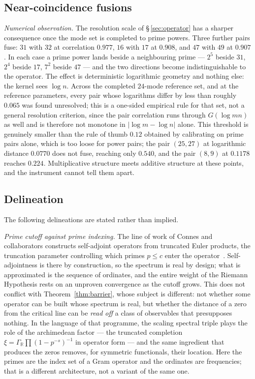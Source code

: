 \documentclass[11pt]{article}
\begin{document}
\subsection{Near-coincidence fusions}

\emph{Numerical observation.} The resolution scale of
\S\,\ref{sec:operator} has a sharper consequence once
the mode set is completed to prime powers. Three further pairs fuse: $31$ with $32$ at
correlation $0.977$, $16$ with $17$ at $0.908$, and $47$ with $49$ at $0.907$.
In each case a prime power lands beside a neighbouring prime --- $2^5$ beside
$31$, $2^4$ beside $17$, $7^2$ beside $47$ --- and the two directions become
indistinguishable to the operator. The effect is deterministic logarithmic
geometry and nothing else: the kernel sees $\log n$. Across the completed
$24$-mode reference set, and at the reference parameters, every pair whose
logarithms differ by less than roughly $0.065$ was found unresolved; this is
a one-sided empirical rule for that set, not a general resolution criterion,
since the pair correlation runs through $G(\log mn)$ as well and is
therefore not monotone in $|\log m-\log n|$ alone. This threshold is genuinely smaller than the rule of
thumb $0.12$ obtained by calibrating on prime pairs alone, which is too loose
for power pairs; the pair $(25,27)$ at logarithmic distance $0.0770$ does not
fuse, reaching only $0.540$, and the pair $(8,9)$ at $0.1178$ reaches
$0.224$. Multiplicative structure meets additive structure at these points,
and the instrument cannot tell them apart.

\subsection{Delineation}

The following delineations are stated rather than implied.

\emph{Prime cutoff against prime indexing.} The line of work of Connes and
collaborators constructs self-adjoint operators from truncated Euler products,
the truncation parameter controlling which primes $p\le c$ enter the
operator~\cite{Connes26,ConnesVS25,Groskin26a}. Self-adjointness is there by
construction, so the spectrum is real by design; what is approximated is the
sequence of ordinates, and the entire weight of the Riemann Hypothesis rests
on an unproven convergence as the cutoff grows. This does not conflict with
Theorem~\ref{thm:barrier}, whose subject is different: not whether some
operator can be built whose spectrum is real, but whether the distance of a
zero from the critical line can be \emph{read off} a class of observables that
presupposes nothing. In the language of that programme, the scaling spectral
triple plays the role of the archimedean factor --- the truncated completion
$\xi=\Gamma_{\mathbb{R}}\prod(1-p^{-s})^{-1}$ in operator form --- and the same
ingredient that produces the zeros removes, for symmetric functionals, their
location. Here the primes are the index set of a Gram operator and the
ordinates are frequencies; that is a different architecture, not a variant of
the same one.
\end{document}
